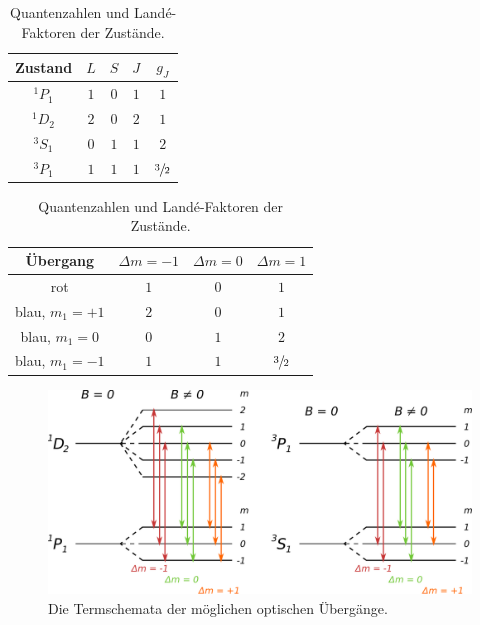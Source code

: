 \begin{table}[H]
    \centering
    \caption{Quantenzahlen und Landé-Faktoren der Zustände.}
    \vspace{-5pt}
    \label{tab:exp_setup}
    \begin{tabular}{c|ccc|c}
        \hline 
        Zustand & $L$ & $S$ & $J$ & $g_J$ \\
        \hline
        \hline
        $^1P_1$ & $1$ & $0$ & $1$ & $1$ \\
        $^1D_2$ & $2$ & $0$ & $2$ & $1$ \\
        $^3S_1$ & $0$ & $1$ & $1$ & $2$ \\ 
        $^3P_1$ & $1$ & $1$ & $1$ & $\sfrac{3}{2}$ \\
        \hline 
    \end{tabular}
    \vspace{-10pt}
\end{table}

\begin{table}[H]
    \centering
    \caption{Quantenzahlen und Landé-Faktoren der Zustände.}
    \vspace{-5pt}
    \label{tab:exp_setup}
    \begin{tabular}{c|ccc}
        \hline 
        Übergang & $\Delta m = -1$ & $\Delta m = 0$ & $\Delta m = 1$ \\
        \hline
        \hline
        rot                 & $1$ & $0$ & $1$ \\
        blau, $m_1 = +1$    & $2$ & $0$ & $1$ \\
        blau, $m_1 = 0$     & $0$ & $1$ & $2$ \\ 
        blau, $m_1 = -1$    & $1$ & $1$ & $\sfrac{3}{2}$ \\
        \hline 
    \end{tabular}
    \vspace{-10pt}
\end{table}

\begin{figure}[H]
    \centering
    \includegraphics[scale=0.3]{content/Zeeman.pdf}
    \caption{Die Termschemata der möglichen optischen Übergänge.}
    \label{fig:term}
\end{figure}

